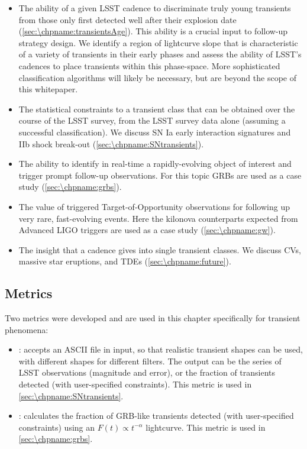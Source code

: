 \begin{itemize}
\item
  The ability of a given LSST cadence to discriminate truly young
  transients from those only first detected well after their explosion date (\autoref{sec:\chpname:transientsAge}).
  This ability is a crucial input to follow-up strategy design.
  We identify a region of lightcurve slope
  that is characteristic of a
  variety of transients in their early phases and assess the ability of LSST's
  cadences to place transients within this phase-space.
  More sophisticated classification algorithms will likely be necessary, but
  are beyond the scope of this whitepaper.
\item
  The statistical constraints to a transient class that can be obtained
  over the course of the LSST survey, from the LSST survey data alone
  (assuming a successful classification). We discuss SN Ia early interaction
  signatures and IIb shock break-out (\autoref{sec:\chpname:SNtransients}).
\item
  The ability to identify in real-time a rapidly-evolving
  object of interest and
  trigger prompt follow-up observations. For this topic GRBs are used as
  a case study (\autoref{sec:\chpname:grbs}).
\item
  The value of triggered Target-of-Opportunity observations for
  following up very rare, fast-evolving events.   Here the kilonova
  counterparts expected from Advanced LIGO triggers are used as a
  case study (\autoref{sec:\chpname:gw}).
\item
  The insight that a cadence gives into single transient classes. We
  discuss CVs, massive star eruptions, and TDEs (\autoref{sec:\chpname:future}).

\end{itemize}



\subsection{Metrics}
\label{sec:\chpname:metrics}

Two metrics were developed and are used in this chapter specifically for transient phenomena:
\begin{itemize}
  \item{: accepts an ASCII file in input, so that realistic transient shapes can be used, with different shapes for different filters. The output can be the series of LSST observations (magnitude and error), or the fraction of transients detected (with user-specified constraints). This metric is used in \autoref{sec:\chpname:SNtransients}.}
  \item{: calculates the fraction of GRB-like transients detected (with user-specified constraints) using an $F(t) \propto t^{-\alpha}$
    lightcurve. This metric is used in \autoref{sec:\chpname:grbs}}.
\end{itemize}

